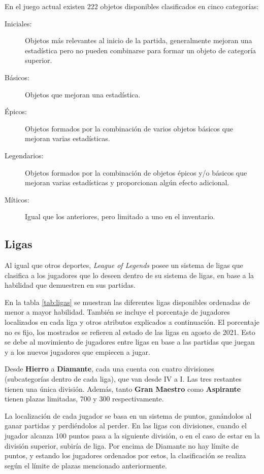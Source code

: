En el juego actual existen 222 objetos disponibles clasificados en cinco categorías:
\begin{description}
	\item[Iniciales:] Objetos más relevantes al inicio de la partida, generalmente mejoran una estadística pero no pueden combinarse para formar un objeto de categoría superior.
	\item[Básicos:] Objetos que mejoran una estadística.
	\item[Épicos:] Objetos formados por la combinación de varios objetos básicos que mejoran varias estadísticas.
	\item[Legendarios:] Objetos formados por la combinación de objetos épicos y/o básicos que mejoran varias estadísticas y proporcionan algún efecto adicional.
	\item[Míticos:] Igual que los anteriores, pero limitado a uno en el inventario.
\end{description}

\subsection{Ligas}
Al igual que otros deportes, \textit{League of Legends} posee un sistema de ligas que clasifica a los jugadores que lo deseen dentro de su sistema de ligas, en base a la habilidad que demuestren en sus partidas.

En la tabla \ref{tab:ligas} se muestran las diferentes ligas disponibles ordenadas de menor a mayor habilidad. También se incluye el porcentaje de jugadores localizados en cada liga\cite{misc:player-distribution} y otros atributos explicados a continuación. El porcentaje no es fijo, los mostrados se refieren al estado de las ligas en agosto de 2021. Esto se debe al movimiento de jugadores entre ligas en base a las partidas que juegan y a los nuevos jugadores que empiecen a jugar.

Desde \textbf{Hierro} a \textbf{Diamante}, cada una cuenta con cuatro divisiones (subcategorías dentro de cada liga), que van desde IV a I. Las tres restantes tienen una única división. Además, tanto \textbf{Gran Maestro} como \textbf{Aspirante} tienen plazas limitadas, 700 y 300 respectivamente.

La localización de cada jugador se basa en un sistema de puntos, ganándolos al ganar partidas y perdiéndolos al perder. En las ligas con divisiones, cuando el jugador alcanza 100 puntos pasa a la siguiente división, o en el caso de estar en la división superior, subiría de liga. Por encima de Diamante no hay límite de puntos, y estando los jugadores ordenados por estos, la clasificación se realiza según el límite de plazas mencionado anteriormente.

